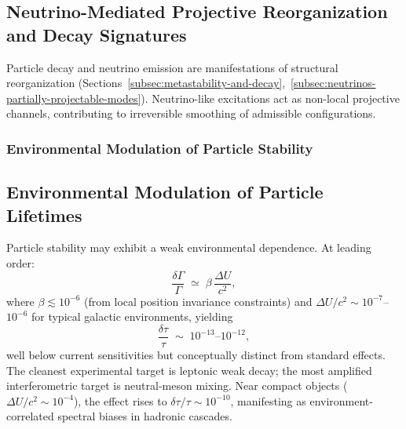 \subsection{Neutrino-Mediated Projective Reorganization and Decay Signatures}
  \label{subsec:neutrino-decay-signatures}

  Particle decay and neutrino emission are manifestations of structural
  reorganization
  (Sections~\ref{subsec:metastability-and-decay},~\ref{subsec:neutrinos-partially-projectable-modes}).
  Neutrino-like excitations act as non-local projective channels,
  contributing to irreversible smoothing of admissible configurations.

  \subsubsection*{Environmental Modulation of Particle Stability}
    \label{subsec:environmental-decay-modulation}

\subsection{Environmental Modulation of Particle Lifetimes}
  \label{subsec:environmental-modulation-lifetimes}

  Particle stability may exhibit a weak environmental dependence.
  At leading order:
  \begin{equation}
    \frac{\delta \Gamma}{\Gamma}
    \;\simeq\;
    \beta \, \frac{\Delta U}{c^{2}},
    \label{eq:lifetime-modulation}
  \end{equation}
  where $\beta \lesssim 10^{-6}$ (from local position invariance
  constraints) and
  $\Delta U / c^{2} \sim 10^{-7}$--$10^{-6}$ for typical galactic
  environments, yielding
  \begin{equation}
    \frac{\delta \tau}{\tau}
    \;\sim\;
    10^{-13} \text{--} 10^{-12},
    \label{eq:lifetime-order-of-magnitude}
  \end{equation}
  well below current sensitivities but conceptually distinct from standard
  effects.
  The cleanest experimental target is leptonic weak decay; the most
  amplified interferometric target is neutral-meson mixing.
  Near compact objects
  ($\Delta U/c^2 \sim 10^{-4}$), the effect rises to
  $\delta\tau/\tau \sim 10^{-10}$, manifesting as environment-correlated
  spectral biases in hadronic cascades.

